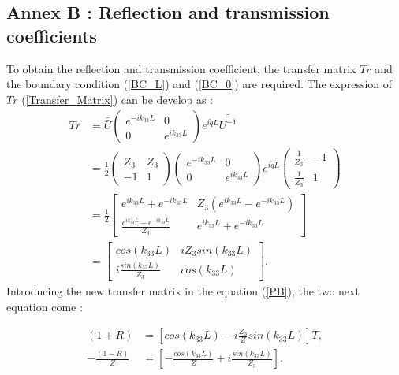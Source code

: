 \documentclass{article}
\begin{document}
\subsection*{Annex B : Reflection and transmission coefficients}
\label{Ann_B}	
    To obtain the reflection and transmission coefficient, the transfer matrix $Tr$ and the boundary condition (\ref{BC_L}) and (\ref{BC_0}) are required.
    The expression of $Tr$ (\ref{Transfer_Matrix}) can be develop as :
     	\begin{align*}
 	Tr &=\bar{\bar{U}} \begin{pmatrix}
                         e^{-ik_{33}L} & 0 \\ 0 & e^{ik_{33}L}
                    \end{pmatrix} e^{i\tilde{q}L} \bar{\bar{U^{-1}}}\\
     &= \frac{1}{2} \begin{pmatrix}
     					Z_3 & Z_3 \\ -1 & 1
      				\end{pmatrix} \begin{pmatrix}
                                   	e^{-ik_{33}L} & 0 \\ 0 & e^{ik_{33}L}
                                   \end{pmatrix} e^{i\tilde{q}L} \begin{pmatrix}
     												\frac{1}{Z_3} & -1 \\ \frac{1}{Z_3} & 1
      											 \end{pmatrix}\\
    &=\frac{1}{2} \begin{bmatrix}
    				e^{ik_{33}L}+e^{-ik_{33}L} & Z_3(e^{ik_{33}L}-e^{-ik_{33}L}) \\ 
    				\frac{e^{ik_{33}L}-e^{-ik_{33}L}}{Z_3} & e^{ik_{33}L}+e^{-ik_{33}L}
    				\end{bmatrix}\\
 	&= \begin{bmatrix}
    				cos(k_{33}L) & i Z_3 sin(k_{33}L) \\ 
    				i\frac{sin(k_{33}L)}{Z_3} & cos(k_{33}L)
    	\end{bmatrix}.
    \end{align*}
    Introducing the new transfer matrix in the equation (\ref{PB}), the two next equation come :
    
    \begin{align}
    (1+R)&=[cos(k_{33}L)-i\frac{Z_3}{Z} sin(k_{33}L)]T,\label{T_cal1} \\ 
    -\frac{(1-R)}{Z}&=[-\frac{cos(k_{33}L)}{Z}+i\frac{sin(k_{33}L)}{Z_3}].\label{T_cal2}
    \end{align}
    
\end{document}

